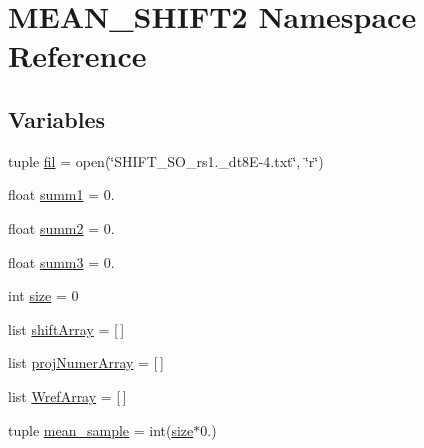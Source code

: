 \hypertarget{namespaceMEAN__SHIFT2}{\section{M\-E\-A\-N\-\_\-\-S\-H\-I\-F\-T2 Namespace Reference}
\label{namespaceMEAN__SHIFT2}
}
\subsection*{Variables}
\begin{DoxyCompactItemize}
\item 
tuple \hyperlink{namespaceMEAN__SHIFT2_a429b645482b4f4848eac1d7ccab15bb8}{fil} = open(\char`\"{}S\-H\-I\-F\-T\-\_\-S\-O\-\_\-rs1.\-\_\-dt8\-E-\/4.txt\char`\"{}, \char`\"{}r\char`\"{})
\item 
float \hyperlink{namespaceMEAN__SHIFT2_aec3003128e620367fee0c667ef1b211c}{summ1} = 0.
\item 
float \hyperlink{namespaceMEAN__SHIFT2_a38573f9df059fdba2d3cfdfa95ce4052}{summ2} = 0.
\item 
float \hyperlink{namespaceMEAN__SHIFT2_af6b4422da32fac478ee53bd81de04947}{summ3} = 0.
\item 
int \hyperlink{namespaceMEAN__SHIFT2_a28b60e534c8af9ea786d58608d9c438e}{size} = 0
\item 
list \hyperlink{namespaceMEAN__SHIFT2_a84af3541352c1d75a94b9d21f5ceb9e2}{shift\-Array} = \mbox{[}$\,$\mbox{]}
\item 
list \hyperlink{namespaceMEAN__SHIFT2_ab52cb1545ab067638f1ed65ce37690e1}{proj\-Numer\-Array} = \mbox{[}$\,$\mbox{]}
\item 
list \hyperlink{namespaceMEAN__SHIFT2_ad9fb44ebe322dc63a83fcad0ce71c741}{Wref\-Array} = \mbox{[}$\,$\mbox{]}
\item 
tuple \hyperlink{namespaceMEAN__SHIFT2_aa93731cd8c0824625a82574955eb220f}{mean\-\_\-sample} = int(\hyperlink{namespaceMEAN__SHIFT2_a28b60e534c8af9ea786d58608d9c438e}{size}$\ast$0.)
\end{DoxyCompactItemize}


